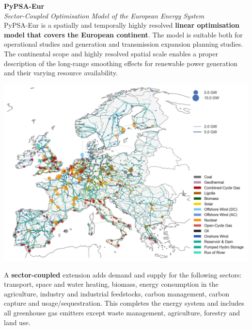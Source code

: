 \documentclass[a0,portrait]{a0poster}
\begin{document}
\begin{multicols}{3}
\begin{tcolorbox}[width=0.95\linewidth,colback={conclusion},frame empty,boxsep=1cm]
\end{tcolorbox}    


\columnbreak
\noindent \textcolor{red100}{\huge \textbf{PyPSA-Eur}}
\\
\textit{Sector-Coupled Optimisation Model of the European Energy System}
\\

\noindent
PyPSA-Eur is a spatially and temporally highly resolved \textbf{linear optimisation 
model that covers the European continent}. The model is suitable both for operational studies and 
generation and transmission expansion planning studies. The continental scope and 
highly resolved spatial scale enables a proper description of the long-range smoothing
effects for renewable power generation and their varying resource availability.


\begin{center}\vspace{1cm}
  \includegraphics[width=1\linewidth]{elec.png}
\end{center}\vspace{1cm}

\noindent
A \textbf{sector-coupled} extension adds demand and supply for the following sectors: transport, 
space and water heating, biomass, energy consumption in the agriculture, industry and 
industrial feedstocks, carbon management, carbon capture and usage/sequestration. This 
completes the energy system and includes all greenhouse gas emitters except waste 
management, agriculture, forestry and land use.


\end{multicols}
\end{document}
